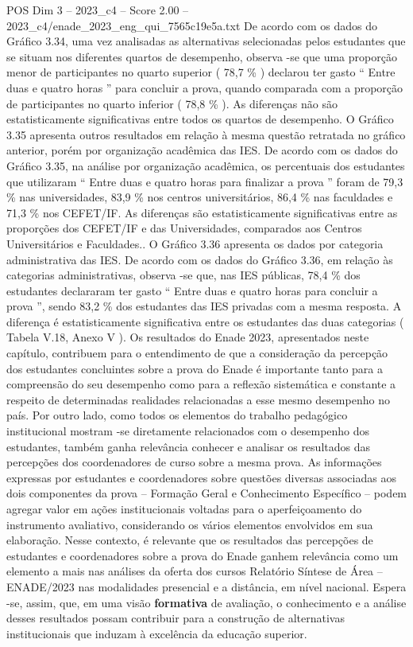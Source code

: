 \begin{textsample}{POS Dim 3 – 2023\_c4 – Score 2.00 – 2023\_c4/enade\_2023\_eng\_qui\_7565c19e5a.txt}
De acordo com os dados do Gráfico 3.34, uma vez analisadas as alternativas selecionadas pelos estudantes que se situam nos diferentes quartos de desempenho, observa -se que uma proporção menor de participantes no quarto superior ( 78,7 \% ) declarou ter gasto “ Entre duas e quatro horas ” para concluir a prova, quando comparada com a proporção de participantes no quarto inferior ( 78,8 \% ).
As diferenças não são estatisticamente significativas entre todos os quartos de desempenho.
O Gráfico 3.35 apresenta outros resultados em relação à mesma questão retratada no gráfico anterior, porém por organização acadêmica das IES.
De acordo com os dados do Gráfico 3.35, na análise por organização acadêmica, os percentuais dos estudantes que utilizaram “ Entre duas e quatro horas para finalizar a prova ” foram de 79,3 \% nas universidades, 83,9 \% nos centros universitários, 86,4 \% nas faculdades e 71,3 \% nos CEFET/IF.
As diferenças são estatisticamente significativas entre as proporções dos CEFET/IF e das Universidades, comparados aos Centros Universitários e Faculdades..
O Gráfico 3.36 apresenta os dados por categoria administrativa das IES.
De acordo com os dados do Gráfico 3.36, em relação às categorias administrativas, observa -se que, nas IES públicas, 78,4 \% dos estudantes declararam ter gasto “ Entre duas e quatro horas para concluir a prova ”, sendo 83,2 \% dos estudantes das IES privadas com a mesma resposta.
A diferença é estatisticamente significativa entre os estudantes das duas categorias ( Tabela V.18, Anexo V ).
Os resultados do Enade 2023, apresentados neste capítulo, contribuem para o entendimento de que a consideração da percepção dos estudantes concluintes sobre a prova do Enade é importante tanto para a compreensão do seu desempenho como para a reflexão sistemática e constante a respeito de determinadas realidades relacionadas a esse mesmo desempenho no país.
Por outro lado, como todos os elementos do trabalho pedagógico institucional mostram -se diretamente relacionados com o desempenho dos estudantes, também ganha relevância conhecer e analisar os resultados das percepções dos coordenadores de curso sobre a mesma prova.
As informações expressas por estudantes e coordenadores sobre questões diversas associadas aos dois componentes da prova – Formação Geral e Conhecimento Específico – podem agregar valor em ações institucionais voltadas para o aperfeiçoamento do instrumento avaliativo, considerando os vários elementos envolvidos em sua elaboração.
Nesse contexto, é relevante que os resultados das percepções de estudantes e coordenadores sobre a prova do Enade ganhem relevância como um elemento a mais nas análises da oferta dos cursos Relatório Síntese de Área – ENADE/2023 nas modalidades presencial e a distância, em nível nacional.
Espera -se, assim, que, em uma visão \textbf{formativa} de avaliação, o conhecimento e a análise desses resultados possam contribuir para a construção de alternativas institucionais que induzam à excelência da educação superior.

\end{textsample}
